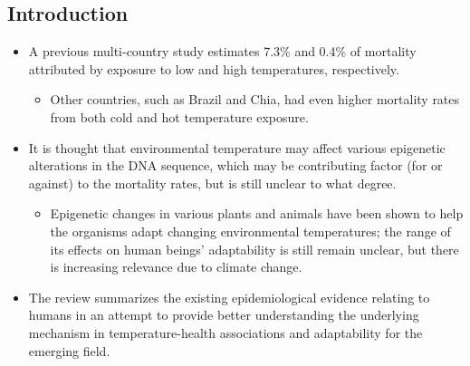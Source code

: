 \documentclass[plain, basic]{inVerba-notes}
\begin{document}
\begin{itemize}
  \subsection{Introduction}
  \begin{itemize}
      \item A previous multi-country study estimates 7.3\% and 0.4\% of mortality attributed by exposure to low and high temperatures, respectively.
        \begin{itemize}
          \item Other countries, such as Brazil and Chia, had even higher mortality rates from both cold and hot temperature exposure.
        \end{itemize}
      \item It is thought that environmental temperature may affect various epigenetic alterations in the DNA sequence, which may be contributing factor (for or against) to the  mortality rates, but is still unclear to what degree.
        \begin{itemize}
          \item Epigenetic changes in various plants and animals have been shown to help the organisms adapt changing environmental temperatures; the range of its effects on human beings' adaptability is still remain unclear, but there is increasing relevance due to climate change.
        \end{itemize}
      \item The review summarizes the existing epidemiological evidence relating to humans in an attempt to provide better understanding the underlying mechanism in temperature-health associations and adaptability for the emerging field.
  \end{itemize}
  

\end{itemize}
\end{document}
